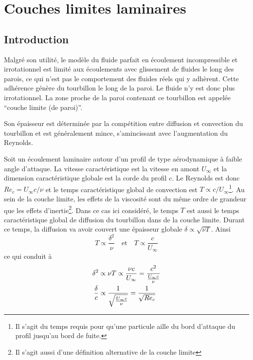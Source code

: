 
\chapter{Couches limites laminaires}
  \section{Introduction}
    Malgré son utilité, le modèle du fluide parfait en écoulement incompressible et irrotationnel est limité aux écoulements avec glissement de fluides le long des parois, ce qui n'est pas le comportement des fluides réels qui y adhèrent. Cette adhérence génère du tourbillon le long de la paroi. Le fluide n'y est donc plus irrotationnel. La zone proche de la paroi contenant ce tourbillon est appelée ``couche limite (de paroi)''.

    Son épaisseur est déterminée par la compétition entre diffusion et convection du tourbillon et est généralement mince, s'amincissant avec l'augmentation du Reynolds.

    Soit un écoulement laminaire autour d'un profil de type aérodynamique à faible angle d'attaque. La vitesse caractéristique est la vitesse en amont $U_\infty$ et la dimension caractéristique globale est la corde du profil $c$. Le Reynolds est donc $Re_c = U_\infty c / \nu$ et le temps caractéristique global de convection est $T \propto c/U_\infty$\footnote{Il s'agit du temps requis pour qu'une particule aille du bord d'attaque du profil jusqu'au bord de fuite.}. Au sein de la couche limite, les effets de la viscosité sont du même ordre de grandeur que les effets d'inertie\footnote{Il s'agit aussi d'une définition alternative de la couche limite}. Dans ce cas ici considéré, le temps $T$ est aussi le temps caractéristique global de diffusion du tourbillon dans de la couche limite. Durant ce temps, la diffusion va avoir couvert une épaisseur globale $\delta \propto \sqrt{\nu T}$. Ainsi
    \begin{equation}
      T \propto \frac{\delta^2}{\nu} \quad \textrm{et} \quad T \propto \frac{c}{U_\infty}
    \end{equation}
    ce qui conduit à
    \begin{equation}
      \begin{aligned}
        \delta^2 &\propto \nu T \propto \frac{\nu c}{U_\infty} = \frac{c^2}{\frac{U_\infty c}{\nu}}\\
        \frac{\delta}{c} &\propto \frac{1}{\sqrt{\frac{U_\infty c}{\nu}}} = \frac{1}{\sqrt{Re_c}}
      \end{aligned}
    \end{equation}

